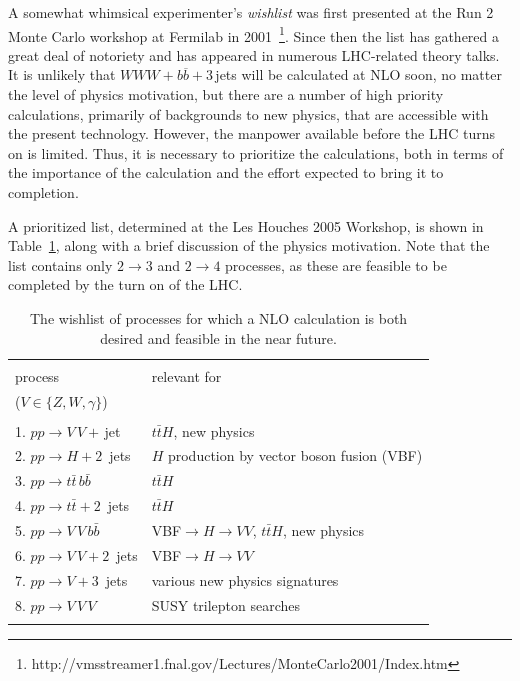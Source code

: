 \documentclass[12pt]{iopart}
\begin{document}
A somewhat whimsical experimenter's {\it wishlist} was first presented at the Run
2 Monte Carlo workshop at Fermilab in 2001~\footnote{
http://vmsstreamer1.fnal.gov/Lectures/MonteCarlo2001/Index.htm}. 
Since then the list has gathered a great deal of notoriety and has appeared in numerous
LHC-related theory talks. It is unlikely that $WWW+b\overline{b}+3$\,jets will be
calculated at NLO soon, no matter the level of physics motivation, but there are a
number of high priority calculations, primarily of backgrounds to new physics,
that are accessible with the present technology. However, the manpower available
before the LHC turns on is limited. Thus, it is necessary to prioritize the
calculations, both in terms of the importance of the calculation and the effort
expected to bring it to completion.

A prioritized list, determined at the Les Houches 2005 Workshop, is shown in Table~\ref{wishlist}, along with a
brief discussion of the physics motivation. Note that the list contains only
$2\rightarrow 3$ and $2\rightarrow 4$ processes, as these are feasible to be completed by the turn on of the LHC.
%
\begin{table}[htb]
\begin{center}
\begin{tabular}{|l|l|}
\hline
&\\
process&relevant for\\
($V\in\{Z,W,\gamma\}$)&\\
\hline
&\\
1. $pp\to V\,V+$\,jet &  $t\bar{t}H$, new physics\\
2. $pp\to H+2$~jets& $H$ production by vector boson fusion (VBF)\\
3. $pp\to t\bar{t}\,b\bar{b}$ &  $t\bar{t}H$\\
4. $pp\to t\bar{t}+2$~jets  &  $t\bar{t}H$\\
5. $pp\to V\,V\,b\bar{b}$ &  VBF$\to H\to VV$, 
$t\bar{t}H$, new physics\\
6. $pp\to V\,V+2$~jets &  VBF$\to H\to VV$\\
7. $pp\to V+3$~jets &  various new physics signatures\\
8. $pp\to V\,V\,V$ &  SUSY trilepton searches\\
&\\
\hline
\end{tabular}
\caption{The wishlist of processes for which a NLO calculation is both desired and feasible
in the near future.
\label{wishlist}
}
\end{center}
\end{table}
%
\end{document}
